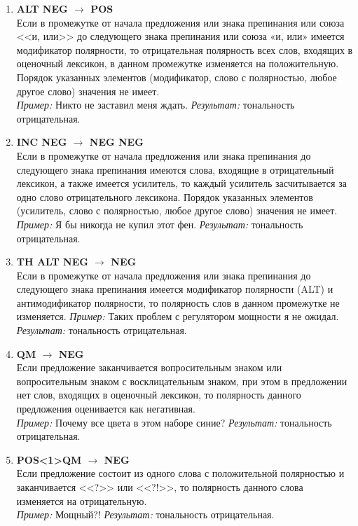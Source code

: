 \begin{enumerate}
	\item \textbf{ALT NEG $\rightarrow$ POS}\\ 
	Если в промежутке от начала предложения или знака препинания или союза <<и, или>> до следующего знака препинания или союза «и, или» имеется модификатор полярности, то отрицательная полярность всех слов, входящих в оценочный лексикон, в данном промежутке изменяется на положительную. Порядок указанных элементов (модификатор, слово с полярностью, любое другое слово) значения не имеет. \\
	\textit{Пример:} Никто не заставил меня ждать. \textit{Результат:} тональность отрицательная.
	\item  \textbf{INC NEG $\rightarrow$ NEG NEG}\\ 
	Если в промежутке от начала предложения или знака препинания до следующего знака препинания имеются слова, входящие в отрицательный лексикон, а также имеется усилитель, то каждый усилитель засчитывается за одно слово отрицательного лексикона. Порядок указанных элементов (усилитель, слово с полярностью, любое другое слово) значения не имеет.\\
	\textit{Пример:} Я бы никогда не купил этот фен. \textit{Результат:} тональность отрицательная.
	\item \textbf{TH ALT NEG $\rightarrow$ NEG}\\ 
	Если в промежутке от начала предложения или знака препинания до следующего знака препинания имеется модификатор полярности (ALT) и антимодификатор полярности, то полярность слов в данном промежутке не изменяется.
	\textit{Пример:} Таких проблем с регулятором мощности я не ожидал. \textit{Результат:} тональность отрицательная.
	\item \textbf{QM $\rightarrow$ NEG}\\ 
	Если предложение заканчивается вопросительным знаком или вопросительным знаком с восклицательным знаком, при этом в предложении нет слов, входящих в оценочный лексикон, то полярность данного предложения оценивается как негативная. \\
	\textit{Пример:} Почему все цвета в этом наборе синие? \textit{Результат:} тональность отрицательная.
	\item \textbf{POS<1>QM $\rightarrow$ NEG}\\
	Если предложение состоит из одного слова с положительной полярностью и заканчивается <<?>> или <<?!>>, то полярность данного слова изменяется на отрицательную.\\
	\textit{Пример:} Мощный?! \textit{Результат:} тональность отрицательная.
	
\end{enumerate}

